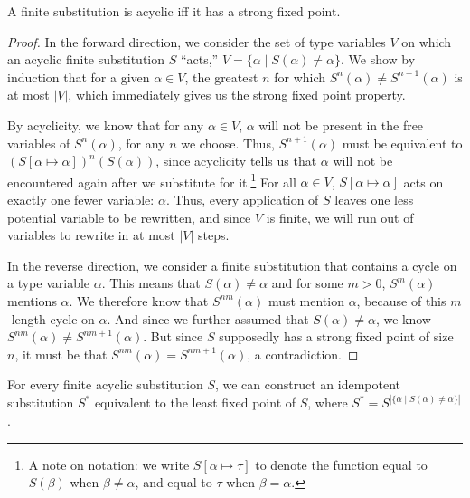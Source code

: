 \documentclass[10pt, letterpaper, oneside]{article}
\begin{document}
\begin{lemma}
  \label{lemma:finite-acyclic-strong}
  A finite substitution is acyclic iff it has a strong fixed point.
\end{lemma}

\begin{proof}
  In the forward direction, we consider the set of type variables \(V\) on which an acyclic finite substitution \(S\) ``acts,'' \(V = \{\alpha \mid S(\alpha) \ne \alpha\}\). We show by induction that for a given \(\alpha \in V\), the greatest \(n\) for which \(S^n(\alpha) \ne S^{n + 1}(\alpha)\) is at most \(|V|\), which immediately gives us the strong fixed point property.

  By acyclicity, we know that for any \(\alpha \in V\), \(\alpha\) will not be present in the free variables of \(S^n(\alpha)\), for any \(n\) we choose. Thus, \(S^{n + 1}(\alpha)\) must be equivalent to \((S[\alpha \mapsto \alpha])^n(S(\alpha))\), since acyclicity tells us that \(\alpha\) will not be encountered again after we substitute for it.\footnote{A note on notation: we write \(S[\alpha \mapsto \tau]\) to denote the function equal to \(S(\beta)\) when \(\beta \ne \alpha\), and equal to \(\tau\) when \(\beta = \alpha\).} For all \(\alpha \in V\), \(S[\alpha \mapsto \alpha]\) acts on exactly one fewer variable: \(\alpha\). Thus, every application of \(S\) leaves one less potential variable to be rewritten, and since \(V\) is finite, we will run out of variables to rewrite in at most \(|V|\) steps.

  In the reverse direction, we consider a finite substitution that contains a cycle on a type variable \(\alpha\). This means that \(S(\alpha) \ne \alpha\) and for some \(m > 0\), \(S^m(\alpha)\) mentions \(\alpha\). We therefore know that \(S^{nm}(\alpha)\) must mention \(\alpha\), because of this \(m\)-length cycle on \(\alpha\). And since we further assumed that \(S(\alpha) \ne \alpha\), we know \(S^{nm}(\alpha) \ne S^{nm + 1}(\alpha)\). But since \(S\) supposedly has a strong fixed point of size \(n\), it must be that \(S^{nm}(\alpha) = S^{nm + 1}(\alpha)\), a contradiction.
\end{proof}

\begin{corollary}
  \label{corollary:idempotize}
  For every finite acyclic substitution \(S\), we can construct an idempotent substitution \(S^\ast\) equivalent to the least fixed point of \(S\), where \(S^\ast = S^{|\{\alpha \mid S(\alpha) \ne \alpha\}|}\).
\end{corollary}
\end{document}

